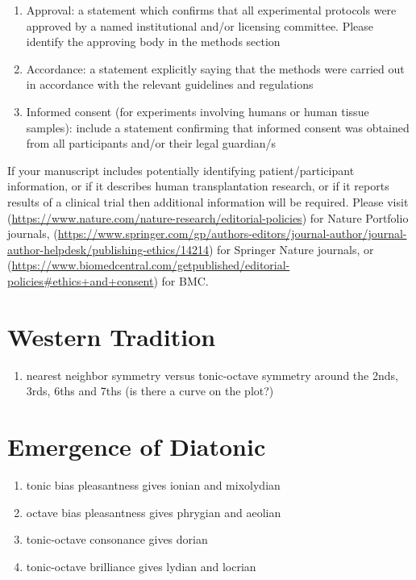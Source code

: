 \documentclass[sn-mathphys]{sn-jnl}%
\begin{document}
\begin{enumerate}[1.]
\item Approval: a statement which confirms that all experimental protocols were approved by a named institutional and/or licensing committee. Please identify the approving body in the methods section

\item Accordance: a statement explicitly saying that the methods were carried out in accordance with the relevant guidelines and regulations

\item Informed consent (for experiments involving humans or human tissue samples): include a statement confirming that informed consent was obtained from all participants and/or their legal guardian/s
\end{enumerate}

If your manuscript includes potentially identifying patient/participant information, or if it describes human transplantation research, or if it reports results of a clinical trial then  additional information will be required. Please visit (\url{https://www.nature.com/nature-research/editorial-policies}) for Nature Portfolio journals, (\url{https://www.springer.com/gp/authors-editors/journal-author/journal-author-helpdesk/publishing-ethics/14214}) for Springer Nature journals, or (\url{https://www.biomedcentral.com/getpublished/editorial-policies\#ethics+and+consent}) for BMC.

\section{Western Tradition}\label{sec12}

\begin{enumerate}
\item nearest neighbor symmetry versus tonic-octave symmetry around the 2nds, 3rds, 6ths and 7ths (is there a curve on the plot?)
\end{enumerate}
\section{Emergence of Diatonic}\label{diatonicSec}
\begin{enumerate}
\item tonic bias pleasantness gives ionian and mixolydian
\item octave bias pleasantness gives phrygian and aeolian
\item tonic-octave consonance gives dorian
\item tonic-octave brilliance gives lydian and locrian
\end{enumerate}
\end{document}
